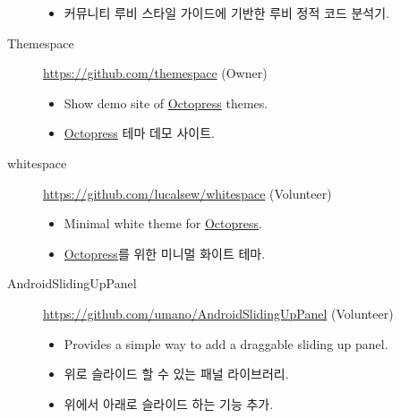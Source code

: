 \documentclass[a4paper,10pt]{article}
\begin{document}
\begin{description}
\begin{itemize}
      \item 커뮤니티 루비 스타일 가이드에 기반한 루비 정적 코드 분석기.
    \end{itemize}
  \item[Themespace] \url{https://github.com/themespace} (Owner)
    \begin{itemize}
      \item Show demo site of \href{http://octopress.org}{Octopress} themes.
      \item \href{http://octopress.org}{Octopress} 테마 데모 사이트.
    \end{itemize}
  \item[whitespace] \url{https://github.com/lucalsew/whitespace} (Volunteer)
    \begin{itemize}
      \item Minimal white theme for \href{http://octopress.org}{Octopress}.
      \item \href{http://octopress.org}{Octopress}를 위한 미니멀 화이트 테마.
    \end{itemize}
  \item[AndroidSlidingUpPanel] \url{https://github.com/umano/AndroidSlidingUpPanel} (Volunteer)
    \begin{itemize}
      \item Provides a simple way to add a draggable sliding up panel.
      \item 위로 슬라이드 할 수 있는 패널 라이브러리.
      \item 위에서 아래로 슬라이드 하는 기능 추가.
    \end{itemize}
\end{description}


\end{document}
